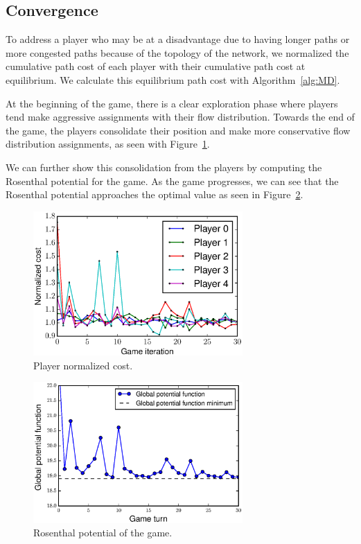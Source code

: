 \documentclass{sig-alternate-ipsn13}
\begin{document}
\subsection{Convergence}

To address a player who may be at a disadvantage due to having longer paths or more congested paths because of the topology of the network, we normalized the cumulative path cost of each player with their cumulative path cost at equilibrium. We calculate this equilibrium path cost with Algorithm~\ref{alg:MD}.

At the beginning of the game, there is a clear exploration phase where players tend make aggressive assignments with their flow distribution. Towards the end of the game, the players consolidate their position and make more conservative flow distribution assignments, as seen with Figure~\ref{fig:normalized_costs}.

We can further show this consolidation from the players by computing the Rosenthal potential for the game. As the game progresses, we can see that the Rosenthal potential approaches the optimal value as seen in Figure~\ref{fig:global_potential}.

\begin{figure}
  \centering
  \includegraphics[width=80mm]{images/players_costs}
  \caption{Player normalized cost.}
  \label{fig:normalized_costs}
\end{figure}

\begin{figure}
  \centering
  \includegraphics[width=80mm]{images/global_potential_function}
  \caption{Rosenthal potential of the game.}
  \label{fig:global_potential}
\end{figure}
\end{document}
